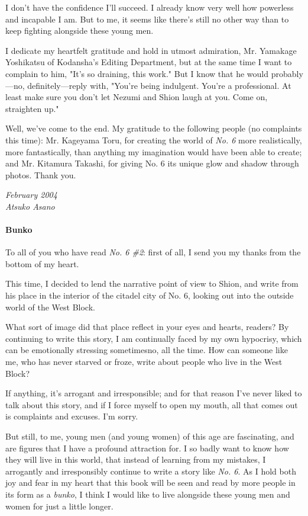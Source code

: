 I don't have the confidence I'll succeed. I already know very well how
powerless and incapable I am. But to me, it seems like there's still no
other way than to keep fighting alongside these young men.

I dedicate my heartfelt gratitude and hold in utmost admiration, Mr.
Yamakage Yoshikatsu of Kodansha's Editing Department, but at the same
time I want to complain to him, "It's so draining, this work." But I
know that he would probably---no, definitely---reply with, "You're being
indulgent. You're a professional. At least make sure you don't let
Nezumi and Shion laugh at you. Come on, straighten up."

Well, we've come to the end. My gratitude to the following people (no
complaints this time): Mr. Kageyama Toru, for creating the world of \emph{No.
6} more realistically, more fantastically, than anything my imagination
would have been able to create; and Mr. Kitamura Takashi, for giving No.
6 its unique glow and shadow through photos. Thank you.

\myspace

\emph{February 2004\\
Atsuko Asano}

\paragraph{Bunko}

To all of you who have read \emph{No. 6 \#2}: first of all, I send you my
thanks from the bottom of my heart.

This time, I decided to lend the narrative point of view to Shion, and
write from his place in the interior of the citadel city of No. 6,
looking out into the outside world of the West Block.

What sort of image did that place reflect in your eyes and hearts,
readers? By continuing to write this story, I am continually faced by my
own hypocrisy, which can be emotionally stressing sometimes\el no, all
the time. How can someone like me, who has never starved or froze, write
about people who live in the West Block?

If anything, it's arrogant and irresponsible; and for that reason I've
never liked to talk about this story, and if I force myself to open my
mouth, all that comes out is complaints and excuses. I'm sorry.

But still, to me, young men (and young women) of this age are
fascinating, and are figures that I have a profound attraction for. I so
badly want to know how they will live in this world, that instead of
learning from my mistakes, I arrogantly and irresponsibly continue to
write a story like \emph{No. 6}. As I hold both joy and fear in my heart that
this book will be seen and read by more people in its form as a \emph{bunko}, I
think I would like to live alongside these young men and women for just
a little longer.

